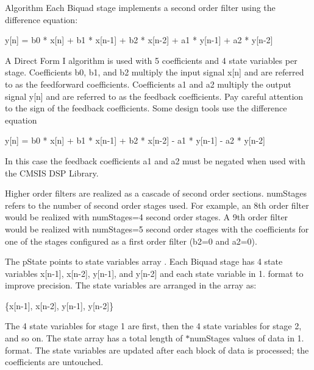 \begin{DoxyParagraph}{Algorithm }
Each Biquad stage implements a second order filter using the difference equation\-: 
\begin{DoxyPre}   
    y[n] = b0 * x[n] + b1 * x[n-1] + b2 * x[n-2] + a1 * y[n-1] + a2 * y[n-2]   
\end{DoxyPre}
 A Direct Form I algorithm is used with 5 coefficients and 4 state variables per stage.  Coefficients {\ttfamily b0, b1, and b2 } multiply the input signal {\ttfamily x\mbox{[}n\mbox{]}} and are referred to as the feedforward coefficients. Coefficients {\ttfamily a1} and {\ttfamily a2} multiply the output signal {\ttfamily y\mbox{[}n\mbox{]}} and are referred to as the feedback coefficients. Pay careful attention to the sign of the feedback coefficients. Some design tools use the difference equation 
\begin{DoxyPre}   
    y[n] = b0 * x[n] + b1 * x[n-1] + b2 * x[n-2] - a1 * y[n-1] - a2 * y[n-2]   
\end{DoxyPre}
 In this case the feedback coefficients {\ttfamily a1} and {\ttfamily a2} must be negated when used with the C\-M\-S\-I\-S D\-S\-P Library.
\end{DoxyParagraph}
\begin{DoxyParagraph}{}
Higher order filters are realized as a cascade of second order sections. {\ttfamily num\-Stages} refers to the number of second order stages used. For example, an 8th order filter would be realized with {\ttfamily num\-Stages=4} second order stages.  A 9th order filter would be realized with {\ttfamily num\-Stages=5} second order stages with the coefficients for one of the stages configured as a first order filter ({\ttfamily b2=0} and {\ttfamily a2=0}).
\end{DoxyParagraph}
\begin{DoxyParagraph}{}
The {\ttfamily p\-State} points to state variables array . Each Biquad stage has 4 state variables {\ttfamily x\mbox{[}n-\/1\mbox{]}, x\mbox{[}n-\/2\mbox{]}, y\mbox{[}n-\/1\mbox{]},} and {\ttfamily y\mbox{[}n-\/2\mbox{]}} and each state variable in 1. format to improve precision. The state variables are arranged in the array as\-: 
\begin{DoxyPre}   
    \{x[n-1], x[n-2], y[n-1], y[n-2]\}   
\end{DoxyPre}

\end{DoxyParagraph}
\begin{DoxyParagraph}{}
The 4 state variables for stage 1 are first, then the 4 state variables for stage 2, and so on. The state array has a total length of {$\ast$num\-Stages} values of data in 1. format. The state variables are updated after each block of data is processed; the coefficients are untouched.
\end{DoxyParagraph}
